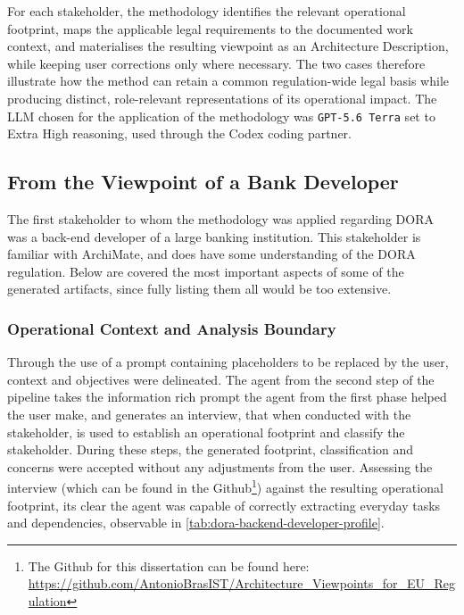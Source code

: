 For each stakeholder, the methodology identifies the relevant operational footprint, maps the applicable legal requirements to the documented work context, and materialises the resulting viewpoint as an Architecture Description, while keeping user corrections only where necessary. The two cases therefore illustrate how the method can retain a common regulation-wide legal basis while producing distinct, role-relevant representations of its operational impact. The \ac{LLM} chosen for the application of the methodology was \texttt{GPT-5.6 Terra} set to Extra High reasoning, used through the Codex coding partner.

\subsection{From the Viewpoint of a Bank Developer}

The first stakeholder to whom the methodology was applied regarding \ac{DORA} was a back-end developer of a large banking institution. This stakeholder is familiar with ArchiMate, and does have some understanding of the \ac{DORA} regulation. Below are covered the most important aspects of some of the generated artifacts, since fully listing them all would be too extensive.

\subsubsection{Operational Context and Analysis Boundary}

Through the use of a prompt containing placeholders to be replaced by the user, context and objectives were delineated.
The agent from the second step of the pipeline takes the information rich prompt the agent from the first phase helped the user make, and generates an interview, that when conducted with the stakeholder, is used to establish an operational footprint and classify the stakeholder. During these steps, the generated footprint, classification and concerns were accepted without any adjustments from the user. Assessing the interview (which can be found in the Github\footnote{\label{github}The Github for this dissertation can be found here: \url{https://github.com/AntonioBrasIST/Architecture_Viewpoints_for_EU_Regulation}}) against the resulting operational footprint, its clear the agent was capable of correctly extracting everyday tasks and dependencies, observable in \ref{tab:dora-backend-developer-profile}.

